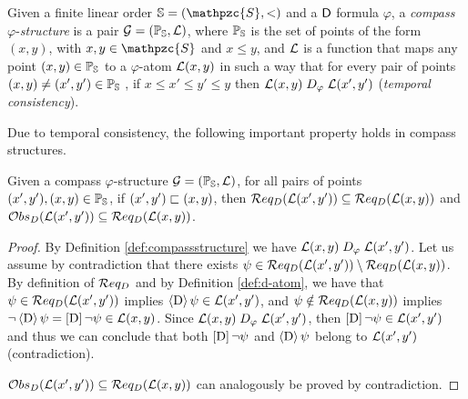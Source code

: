 \begin{definition}\label{def:compassstructure}
Given a finite linear order $\mathbb{S} = (\mathpzc{S}, <)$ and a $\mathsf{D}$ formula $\varphi$, a  \emph{compass}
$\varphi$-\emph{structure} is a pair $\mathcal{G}=(\mathbb{P}_{\mathbb{S}},\mathcal{L})$,
where $\mathbb{P}_{\mathbb{S}}$ is the set of points of the form $(x,y)$,
with $x,y \in \mathpzc{S}$ and $ x\leq y$, and $\mathcal{L}$ is a function that
maps any point $(x,y)\in\mathbb{P}_{\mathbb{S}}$ to a $\varphi$-atom $\mathcal{L}(x,y)$
in such a way that for every pair of points $(x,y)\neq(x',y')\in\mathbb{P}_{\mathbb{S}}$ ,
        if $x\leq x'\leq y'\leq y$ then $\mathcal{L}(x,y) \mathrel{D_\varphi} \mathcal{L}(x',y')$
        (\emph{temporal consistency}).
\end{definition}
%
Due to temporal consistency, the following important property holds in compass structures.
%
\begin{lemma}\label{lem:transitive_req}
Given a compass $\varphi$-structure $\mathcal{G}=(\mathbb{P}_{\mathbb{S}},\mathcal{L})$,
for all pairs of points $(x',y'), (x,y)\in \mathbb{P}_{\mathbb{S}}$,
if $(x',y')\sqsubset (x,y)$,
then $\mathcal{R} eq_D(\mathcal{L}(x',y')) \subseteq \mathcal{R} eq_D(\mathcal{L}(x,y))$ and $\mathcal{O} bs_D(\mathcal{L}(x',y')) \subseteq \mathcal{R} eq_D(\mathcal{L}(x,y))$.
\end{lemma}
%
\begin{proof} 
By Definition \ref{def:compassstructure} we have  $\mathcal{L}(x,y) \mathrel{D_\varphi} \mathcal{L}(x',y')$.
Let us assume by contradiction that there exists  $\psi \in \mathcal{R} eq_D(\mathcal{L}(x',y'))\setminus \mathcal{R} eq_D(\mathcal{L}(x,y))$. By definition of $\mathcal{R} eq_D$ and by Definition  \ref{def:d-atom}, we have that 
$\psi \in \mathcal{R} eq_D(\mathcal{L}(x',y'))$ 
implies   $\operatorname{\langle D\rangle}\psi \in \mathcal{L}(x',y')$, and
$\psi \notin \mathcal{R} eq_D(\mathcal{L}(x,y))$ 
implies   $\neg\operatorname{\langle D\rangle}\psi =\operatorname{\mathopen[ D \mathclose]} \neg \psi \in \mathcal{L}(x,y)$. Since $\mathcal{L}(x,y) \mathrel{D_\varphi} \mathcal{L}(x',y')$,
then $\operatorname{\mathopen[ D \mathclose]} \neg \psi \in \mathcal{L}(x',y')$ and thus we can conclude that
both $\operatorname{\mathopen[ D \mathclose]} \neg \psi$ and $\operatorname{\langle D\rangle} \psi$ belong to $\mathcal{L}(x',y')$ (contradiction).

$\mathcal{O} bs_D(\mathcal{L}(x',y')) \subseteq \mathcal{R} eq_D(\mathcal{L}(x,y))$ can analogously be proved by contradiction.
\end{proof}

